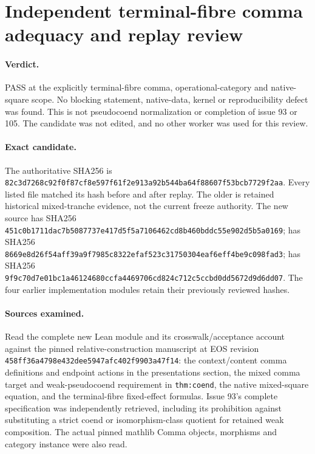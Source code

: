 \documentclass{article}
\begin{document}
\section*{Independent terminal-fibre comma adequacy and replay review}
\paragraph{Verdict.} PASS at the explicitly terminal-fibre comma, operational-category and native-square scope. No blocking statement, native-data, kernel or reproducibility defect was found. This is not pseudocoend normalization or completion of issue 93 or 105. The candidate was not edited, and no other worker was used for this review.

\paragraph{Exact candidate.}
The authoritative  SHA256 is
\texttt{82c3d7268c92f0f87cf8e597f61f2e913a92b544ba64f88607f53bcb7729f2aa}.
Every listed file matched its hash before and after replay. The older  is retained historical mixed-tranche evidence, not the current freeze authority. The new source  has SHA256
\texttt{451c0b1711dac7b5087737e417d5f5a7106462cd8b460bddc55e902d5b5a0169};
 has SHA256
\texttt{8669e8d26f54aff39a9f7985c8322efaf523c31750304eaf6eff4be9c098fad3};
 has SHA256
\texttt{9f9c70d7e01bc1a46124680ccfa4469706cd824c712c5ccbd0dd5672d9d6dd07}.
The four earlier implementation modules retain their previously reviewed hashes.

\paragraph{Sources examined.}
Read the complete new Lean module and its crosswalk/acceptance account against the pinned relative-construction manuscript at EOS revision \texttt{458ff36a4798e432dee5947afc402f9903a47f14}: the context/content comma definitions and endpoint actions in the presentations section, the mixed comma target and weak-pseudocoend requirement in \texttt{thm:coend}, the native mixed-square equation, and the terminal-fibre fixed-effect formulas. Issue 93's complete specification was independently retrieved, including its prohibition against substituting a strict coend or isomorphism-class quotient for retained weak composition. The actual pinned mathlib Comma objects, morphisms and category instance were also read.
\end{document}
